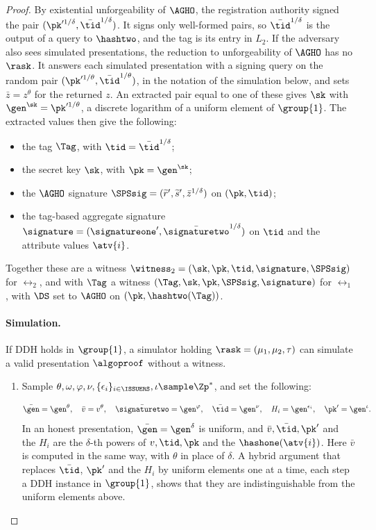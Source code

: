 \begin{proof}
  By existential unforgeability of $\AGHO$, the registration authority signed
the pair $(\pk'^{1/\delta}, \bar{\tid}^{1/\delta})$. It signs only well-formed
pairs, so $\bar{\tid}^{1/\delta}$ is the output of a query to $\hashtwo$, and
the tag is its entry in $L_2$. If the adversary also sees simulated
presentations, the reduction to unforgeability of $\AGHO$ has no $\rask$. It
answers each simulated presentation with a signing query on the random pair
$(\pk'^{1/\theta}, \bar{\tid}^{1/\theta})$, in the notation of the simulation
below, and sets $\bar{z} = z^\theta$ for the returned $z$. An extracted pair
equal to one of these gives $\sk$ with $\gen^\sk = \pk'^{1/\theta}$, a discrete
logarithm of a uniform element of $\group{1}$. The extracted values then give
the following:
  \begin{itemize}
    \item the tag $\Tag$, with $\tid = \bar{\tid}^{1/\delta}$;
    \item the secret key $\sk$, with $\pk = \gen^\sk$;
    \item the $\AGHO$ signature $\SPSsig = (\widetilde{r}', \widetilde{s}',
\bar{z}^{1/\delta})$ on $(\pk, \tid)$;
    \item the tag-based aggregate signature $\signature = (\signatureone',
\bar{\signaturetwo}^{1/\delta})$ on $\tid$ and the attribute values $\atv{i}$.
  \end{itemize}
Together these are a witness $\witness_2 = (\sk, \pk, \tid, \signature,
\SPSsig)$ for $\rel_2$, and with $\Tag$ a witness $(\Tag, \sk, \pk, \SPSsig,
\signature)$ for $\rel_1$, with $\DS$ set to $\AGHO$ on $(\pk, \hashtwo(\Tag))$.

  \paragraph{Simulation.} If DDH holds in $\group{1}$, a simulator holding
$\rask = (\mu_1, \mu_2, \tau)$ can simulate a valid presentation $\algoproof$
without a witness.

  \begin{enumerate}

    \item Sample $\theta, \omega, \varphi, \nu, \{\epsilon_i\}_{i\in
\ISSUERS},  \iota \sample \Zp^*$, and set the following:

%
      \begin{equation*}
%
	\bar{\gen} = \gen^\theta, \quad \bar{v} = v^\theta, \quad
\bar{\signaturetwo} = \gen^\varphi, \quad \bar{\tid} = \gen^\nu, \quad H_i =
\gen^{\epsilon_i}, \quad \pk' = \gen^\iota.
%
      \end{equation*}
%
      In an honest presentation, $\bar{\gen} = \gen^\delta$ is uniform, and
$\bar{v}, \bar{\tid}, \pk'$ and the $H_i$ are the $\delta$-th powers of $v,
\tid, \pk$ and the $\hashone(\atv{i})$. Here $\bar{v}$ is computed in the same
way, with $\theta$ in place of $\delta$. A hybrid argument that replaces
$\bar{\tid}$, $\pk'$ and the $H_i$ by uniform elements one at a time, each step
a DDH instance in $\group{1}$, shows that they are indistinguishable from the
uniform elements above.


\end{enumerate}
\end{proof}
